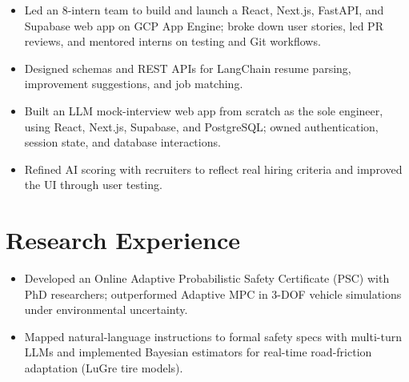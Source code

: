 \documentclass[11pt, letterpaper]{article}
\begin{document}
\vspace{1pt}
\begin{itemize}
  \item Led an 8-intern team to build and launch a React, Next.js, FastAPI, and Supabase web app on GCP App Engine; broke down user stories, led PR reviews, and mentored interns on testing and Git workflows.
  \item Designed schemas and REST APIs for LangChain resume parsing, improvement suggestions, and job matching.
\end{itemize}

\vspace{1pt}
\begin{itemize}
  \item Built an LLM mock-interview web app from scratch as the sole engineer, using React, Next.js, Supabase, and PostgreSQL; owned authentication, session state, and database interactions.
  \item Refined AI scoring with recruiters to reflect real hiring criteria and improved the UI through user testing.
\end{itemize}

\section{Research Experience}
\begin{itemize}
  \item Developed an Online Adaptive Probabilistic Safety Certificate (PSC) with PhD researchers; outperformed Adaptive MPC in 3-DOF vehicle simulations under environmental uncertainty.
  \item Mapped natural-language instructions to formal safety specs with multi-turn LLMs and implemented Bayesian estimators for real-time road-friction adaptation (LuGre tire models).
\end{itemize}
\end{document}
